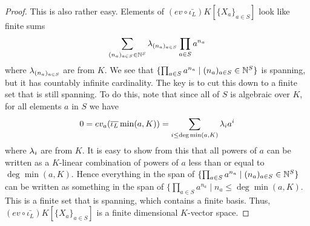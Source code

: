 \documentclass[../book.tex]{subfiles}
\begin{document}
\begin{proof}
    This is also rather easy. 
    Elements of $(ev \circ \bar{\iota_L}) K[\{X_a\}_{a\in S}]$ look like
    finite sums
    \[
        \sum_{(n_a)_{a \in S} \in \mathbb{N}^{S}} 
        \lambda_{(n_a)_{a \in S}} \prod_{a \in S} a^{n_a}
    \]
    where $\lambda_{(n_a)_{a \in S}}$ are from $K$. 
    We see that $\{ \prod_{a \in S} a^{n_a} \mid (n_a)_{a \in S} \in \mathbb{N}^{S}\}$
    is spanning, but
    it has countably infinite cardinality. 
    The key is to cut this down to a finite set that is still spanning. 
    To do this, note that since all of $S$ is algebraic over $K$, 
    for all elements $a$ in $S$ we have \[
        0 = ev_a(\overline{\iota_L} \min(a,K)) = \sum_{i\leq\deg\min(a,K)} \lambda_i a^i
    \]
    where $\lambda_i$ are from $K$. 
    It is easy to show from this that all powers of $a$ 
    can be written as a $K$-linear combination of powers of $a$ 
    less than or equal to $\deg\min(a,K)$. 
    Hence everything in the span of 
    $\{ \prod_{a \in S} a^{n_a} \mid (n_a)_{a \in S} \in \mathbb{N}^{S}\}$
    can be written as something in the span of 
    $\{ \prod_{a \in S} a^{n_a} \mid n_a \leq \deg\min(a,K)$. 
    This is a finite set that is spanning,
    which contains a finite basis. 
    Thus, $(ev \circ \bar{\iota_L}) K[\{X_a\}_{a\in S}]$ is
    a finite dimensional $K$-vector space.  

\end{proof} 
\end{document}
